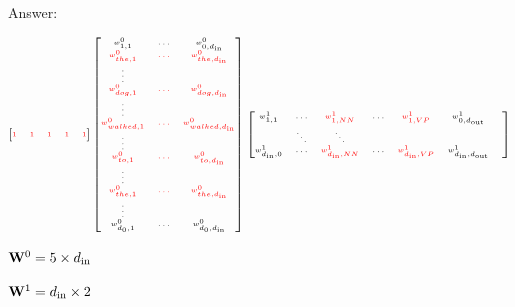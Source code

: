 \documentclass{beamer}
\begin{document}
\begin{frame}{Answer: }
  \begin{center}





      
  \[{\tiny
    \begin{bmatrix}
       \textcolor{red}{1}   & \textcolor{red}{1} &  \textcolor{red}{1} &
 \textcolor{red}{1}  & \textcolor{red}{1} \\
    \end{bmatrix}
    \begin{bmatrix}
      w^0_{1,1} &  \ldots &w^0_{0, {d_{\mathrm{in}}}}\\
      \textcolor{red}{w^0_{the,1}} &  \textcolor{red}{\ldots} &\textcolor{red}{w^0_{the,{d_{\mathrm{in}}}}}\\
      \vdots \\
      \textcolor{red}{w^0_{dog,1}} &  \textcolor{red}{\ldots} &\textcolor{red}{w^0_{dog,{d_{\mathrm{in}}}}}\\
      \vdots \\
      \textcolor{red}{w^0_{walked,1}} &  \textcolor{red}{\ldots} &\textcolor{red}{w^0_{walked,{d_{\mathrm{in}}}}}\\
      \vdots \\
      \textcolor{red}{w^0_{to,1}} &  \textcolor{red}{\ldots} &\textcolor{red}{w^0_{to,{d_{\mathrm{in}}}}}\\
      \vdots \\
      \textcolor{red}{w^0_{the,1}} &  \textcolor{red}{\ldots} &\textcolor{red}{w^0_{the,{d_{\mathrm{in}}}}}\\
      \vdots \\
      w^0_{d_0, 1} &  \ldots &w^0_{d_0, {d_{\mathrm{in}}}}\\
    \end{bmatrix}
    \begin{bmatrix}
      w^1_{1,1} &  \ldots&  \textcolor{red}{w^1_{1,NN}} & \ldots &  \textcolor{red}{w^1_{1,VP}} &    w^1_{0, {d_{\mathrm{out}}}}\\
                & \ddots & \ddots &                    &         &                                   &  \\
      w^1_{{d_{\mathrm{in}}},0} &  \ldots&  \textcolor{red}{w^1_{{d_{\mathrm{in}}},NN}} & \ldots &  \textcolor{red}{w^1_{{d_{\mathrm{in}}},VP}} &  w^1_{{d_{\mathrm{in}}}, {d_{\mathrm{out}}}}\\
    \end{bmatrix}
    }
  \]



\air

  $\mathbf{W}^0 = 5 \times {d_{\mathrm{in}}}$

  $\mathbf{W}^1 = {d_{\mathrm{in}}} \times 2$
  \end{center}

\end{frame}
\end{document}
